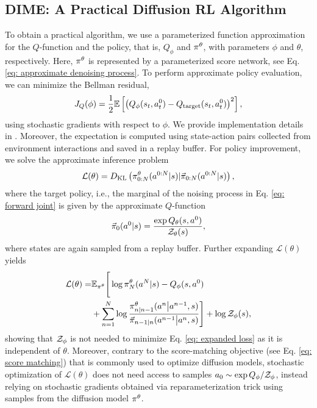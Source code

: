 \subsection{DIME: A Practical Diffusion RL Algorithm}\label{dime_practical}
To obtain a practical algorithm, we use a parameterized function approximation for the $Q$-function and the policy, that is, $Q_{\phi}$ and $\pi^{\theta}$, with parameters $\phi$  and $\theta$, respectively.  Here, $\pi^{\theta}$ is represented by a parameterized score network, see Eq. \ref{eq: approximate denoising process}. 
%
To perform approximate policy evaluation, we can minimize the Bellman residual,  
\begin{equation}\label{eq::Bellman_Residual}
    J_Q(\phi) = \frac{1}{2}\mathbb{E}\left[\left(Q_{\phi}(s_t,a^0_t) - Q_{\text{target}}(s_t,a^0_t)\right)^2\right],
\end{equation}
using stochastic gradients with respect to $\phi$. We provide implementation details in . Moreover, the expectation is computed using state-action pairs collected from environment interactions and saved in a replay buffer. 
%
For policy improvement, we solve the approximate inference problem 
\begin{equation}
\label{eq: joint control as inference2}
\mathcal{L}(\theta) = D_{\text{KL}}\left(\pi^{\theta}_{0:N}(a^{0:N}|s)|\vec{\pi}_{0:N}(a^{0:N}|s)\right),
\end{equation}
where the target policy, i.e., the marginal of the noising process in Eq. \ref{eq: forward joint} is given by the approximate $Q$-function
\begin{equation}
    \vec{\pi}_{0}(a^{0}|s) = \frac{\exp Q_{\theta}(s, a^0)}{\mathcal{Z}_{\theta}(s)},
\end{equation}
where states are again sampled from a replay buffer.
Further expanding $\mathcal{L}(\theta)$ yields
\begin{align}
\label{eq: expanded loss}
    \mathcal{L}(\theta) = & \mathbb{E}_{\pi^{\theta}}\Bigg[ \log \pi^{\theta}_N(a^N|s) - Q_{\phi}(s,a^0)   \\ \nonumber
    & + \sum_{n=1}^N \log\frac{\pi^{\theta}_{n|n-1}(a^{n} \big| a^{n-1},s)}{\vec{\pi}_{n-1|n}(a^{n-1} \big| a^{n},s)} \Bigg] + \log \mathcal{Z}_{\phi}(s),
\end{align}
showing that $\mathcal{Z}_{\phi}$ is not needed to minimize Eq. \ref{eq: expanded loss} as it is independent of $\theta$. Moreover, contrary to the score-matching objective (see Eq. \ref{eq: score matching}) that is commonly used to optimize diffusion models, stochastic optimization of $\mathcal{L}(\theta)$ does not need access to samples $a_0 \sim \exp Q_{\phi}/\mathcal{Z}_{\phi}$, instead relying on stochastic gradients obtained via reparameterization trick \cite{kingma2013auto} using samples from the diffusion model $\pi^{\theta}$.

